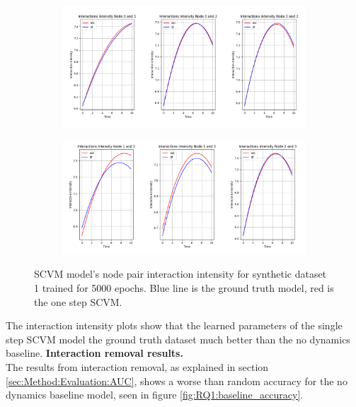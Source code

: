 \begin{figure}[H]
    \centering
    \begin{subfigure}[b]{\textwidth}
        \centering
        \includegraphics[width=\textwidth]{0_images/rq1_SCVM_intensity_plot1.png}
    \end{subfigure}
    \vfill
    \begin{subfigure}[b]{\textwidth}
        \centering
        \includegraphics[width=\textwidth]{0_images/rq1_SCVM_intensity_plot2.png}
    \end{subfigure}
    \caption{SCVM model's node pair interaction intensity for synthetic dataset 1 trained for 5000 epochs. Blue line is the ground truth model, red is the one step SCVM.}
    \label{fig:RQ1:SCVM_intensity}
\end{figure}
\noindent
The interaction intensity plots show that the learned parameters of the single step SCVM model the ground truth dataset much better than the no dynamics baseline.
\clearpage
\noindent
\textbf{Interaction removal results.}
\\
The results from interaction removal, as explained in section \ref{sec:Method:Evaluation:AUC}, shows a worse than random accuracy for the no dynamics baseline model, seen in figure \ref{fig:RQ1:baseline_accuracy}.
